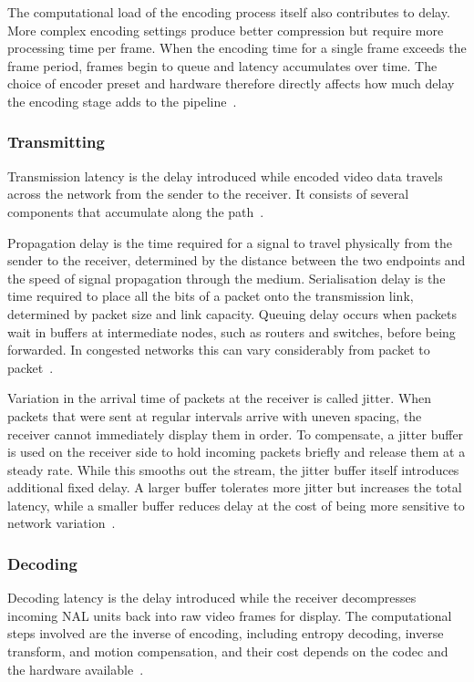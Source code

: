 The computational load of the encoding process itself also contributes to delay. More complex encoding settings produce better compression but require more processing time per frame. When the encoding time for a single frame exceeds the frame period, frames begin to queue and latency accumulates over time. The choice of encoder preset and hardware therefore directly affects how much delay the encoding stage adds to the pipeline~\cite{axis2024}.

\subsubsection{Transmitting}\label{subsec:transmitting}
Transmission latency is the delay introduced while encoded video data travels across the network from the sender to the receiver. It consists of several components that accumulate along the path~\cite{forouzan2012}.
 
Propagation delay is the time required for a signal to travel physically from the sender to the receiver, determined by the distance between the two endpoints and the speed of signal propagation through the medium. Serialisation delay is the time required to place all the bits of a packet onto the transmission link, determined by packet size and link capacity. Queuing delay occurs when packets wait in buffers at intermediate nodes, such as routers and switches, before being forwarded. In congested networks this can vary considerably from packet to packet~\cite{forouzan2012}.
 
Variation in the arrival time of packets at the receiver is called jitter. When packets that were sent at regular intervals arrive with uneven spacing, the receiver cannot immediately display them in order. To compensate, a jitter buffer is used on the receiver side to hold incoming packets briefly and release them at a steady rate. While this smooths out the stream, the jitter buffer itself introduces additional fixed delay. A larger buffer tolerates more jitter but increases the total latency, while a smaller buffer reduces delay at the cost of being more sensitive to network variation~\cite{axis2024}.

\subsubsection{Decoding}\label{subsec:decoding}
Decoding latency is the delay introduced while the receiver decompresses incoming NAL units back into raw video frames for display. The computational steps involved are the inverse of encoding, including entropy decoding, inverse transform, and motion compensation, and their cost depends on the codec and the hardware available~\cite{hamidouche2022}.
 
